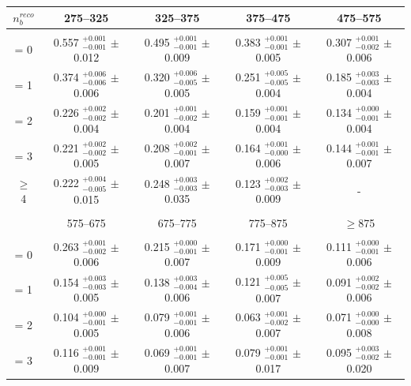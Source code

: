\def\arraystretch{1.3}
\begin{table}[ht!]
\begin{center}
\footnotesize
\begin{tabular*}{0.95\textwidth}{@{\extracolsep{\fill}} ccccc}
\hline
$n_{b}^{reco}$         & 275--325                  & 325--375                  & 375--475                  & 475--575                 \\ 
\hline\hline
\\
= 0                    & 0.557 $^{+0.001}_{-0.001}$  $\pm$  0.012       & 0.495 $^{+0.001}_{-0.001}$  $\pm$  0.009       & 0.383 $^{+0.001}_{-0.001}$  $\pm$  0.005       & 0.307 $^{+0.001}_{-0.002}$  $\pm$  0.006      \\
= 1                    & 0.374 $^{+0.006}_{-0.006}$  $\pm$  0.006       & 0.320 $^{+0.006}_{-0.005}$ $\pm$  0.005        & 0.251 $^{+0.005}_{-0.005}$ $\pm$  0.004        & 0.185 $^{+0.003}_{-0.003}$  $\pm$  0.004      \\
= 2                    & 0.226 $^{+0.002}_{-0.002}$  $\pm$  0.004       & 0.201 $^{+0.001}_{-0.002}$ $\pm$  0.004        & 0.159 $^{+0.001}_{-0.001}$ $\pm$  0.004       & 0.134 $^{+0.000}_{-0.001}$   $\pm$  0.004      \\
= 3                    & 0.221 $^{+0.002}_{-0.002}$  $\pm$  0.005       & 0.208 $^{+0.002}_{-0.001}$ $\pm$  0.007       & 0.164 $^{+0.001}_{-0.000}$  $\pm$  0.006       & 0.144 $^{+0.001}_{-0.001}$   $\pm$  0.007      \\
$\geq$ 4               & 0.222 $^{+0.004}_{-0.005}$  $\pm$  0.015       & 0.248 $^{+0.003}_{-0.003}$ $\pm$  0.035       & 0.123 $^{+0.002}_{-0.003}$  $\pm$  0.009       & -     \\ 
\\
\hline
                       & 575--675                  & 675--775                  & 775--875                  & $\geq$875           \\ 
\hline\hline
\\
= 0                    & 0.263 $^{+0.001}_{-0.002}$  $\pm$  0.006       & 0.215 $^{+0.000}_{-0.001}$  $\pm$  0.007       & 0.171 $_{-0.001}^{+0.000}$ $\pm$  0.009       & 0.111 $_{-0.001}^{+0.000}$  $\pm$  0.006      \\
= 1                    & 0.154 $^{+0.003}_{-0.003}$  $\pm$  0.005       & 0.138 $^{+0.003}_{-0.004}$  $\pm$  0.006       & 0.121 $^{+0.005}_{-0.005}$  $\pm$  0.007       & 0.091 $^{+0.002}_{-0.002}$  $\pm$  0.006      \\
= 2                    & 0.104 $^{+0.000}_{-0.001}$  $\pm$  0.005       & 0.079 $^{+0.001}_{-0.001}$  $\pm$  0.006       & 0.063 $^{+0.001}_{-0.002}$  $\pm$  0.007       & 0.071 $^{+0.000}_{-0.000}$  $\pm$  0.008      \\
= 3                    & 0.116 $^{+0.001}_{-0.001}$  $\pm$  0.009       & 0.069 $^{+0.001}_{-0.001}$  $\pm$  0.007       & 0.079 $^{+0.001}_{-0.001}$  $\pm$  0.017       & 0.095 $_{-0.002}^{+0.003}$  $\pm$  0.020      \\ 


\end{tabular*}
\end{center}
\end{table}
